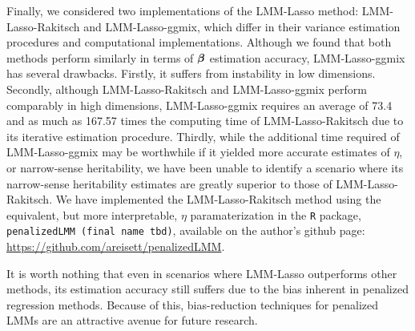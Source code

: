 Finally, we considered two implementations of the LMM-Lasso method: LMM-Lasso-Rakitsch and LMM-Lasso-ggmix, which differ in their variance estimation procedures and computational implementations. Although we found that both methods perform similarly in terms of $\boldsymbol{\beta}{}$ estimation accuracy, LMM-Lasso-ggmix has several drawbacks. Firstly, it suffers from instability in low dimensions.  Secondly, although LMM-Lasso-Rakitsch and LMM-Lasso-ggmix perform comparably in high dimensions, LMM-Lasso-ggmix requires an average of 73.4 and as much as 167.57  times the computing time of LMM-Lasso-Rakitsch due to its iterative estimation procedure. Thirdly, while the additional time required of LMM-Lasso-ggmix may be worthwhile if it yielded more accurate estimates of $\eta$, or narrow-sense heritability, we have been unable to identify a scenario where its narrow-sense heritability estimates are greatly superior to those of LMM-Lasso-Rakitsch. We have implemented the LMM-Lasso-Rakitsch method using the equivalent, but more interpretable, $\eta$ paramaterization in the \texttt{R} package, \texttt{penalizedLMM (final name tbd)}, available on the author's github page: \url{https://github.com/areisett/penalizedLMM}.


It is worth nothing that even in scenarios where LMM-Lasso outperforms other methods, its estimation accuracy still suffers due to the bias inherent in penalized regression methods. Because of this, bias-reduction techniques for penalized LMMs are an attractive avenue for future research.



